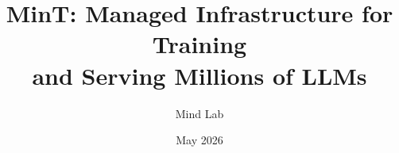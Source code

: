 \documentclass{mindlab}
\title{MinT: Managed Infrastructure for Training\\ and Serving Millions of LLMs}
\author{Mind Lab}
\date{May 2026}
\begin{document}
\maketitle












\newpage
\begin{appendices}

\end{appendices}
\end{document}
